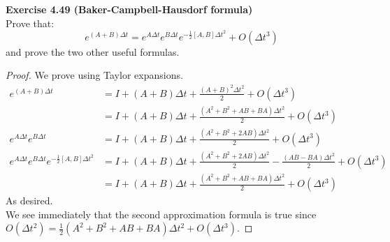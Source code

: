 \documentclass{article}
\begin{document}
\begin{tcolorbox}\textbf{Exercise 4.49 (Baker-Campbell-Hausdorf formula)}\\
	Prove that:
	$$e^{(A+B)\Delta t} = e^{A \Delta t} e^{B \Delta t}e^{-\frac12 [A,B] \Delta t^2} + O(\Delta t^3)$$
	and prove the two other useful formulas.
	\begin{proof}
		We prove using Taylor expansions.\\
		\begin{align*} 
			e^{(A+B)\Delta t} &= I + (A+B)\Delta t + \frac{(A+B)^2\Delta t^2}{2} + O(\Delta t^3)\\
				&= I + (A+B)\Delta t + \frac{(A^2 + B^2 + AB + BA)\Delta t^2}{2} + O(\Delta t^3)\\
			e^{A\Delta t}e^{B \Delta t} &= I + (A + B) \Delta t + \frac{(A^2 + B^2 + 2AB)\Delta t^2}{2} + O(\Delta t^3)\\
			e^{A\Delta t}e^{B \Delta t}e^{-\frac12[A,B]\Delta t^2} &=  I + (A + B) \Delta t + \frac{(A^2 + B^2 + 2AB)\Delta t^2}{2} - \frac{(AB-BA)\Delta t^2}{2} +  O(\Delta t^3)\\  
  &= I + (A + B) \Delta t + \frac{(A^2 + B^2 + AB +BA)\Delta t^2}{2} + O(\Delta t^3)
		\end{align*}
		As desired.\\
		We see immediately that the second approximation formula is true since $O(\Delta t^2) = \frac12(A^2 + B^2 + AB +BA)\Delta t^2  + O(\Delta t^3)$.
	\end{proof}
\end{tcolorbox}
\end{document}
